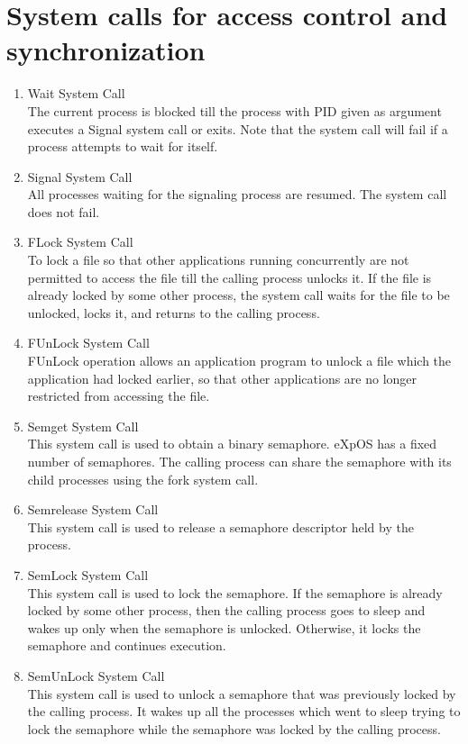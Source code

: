 \section{System calls for access control and synchronization}
\begin{enumerate}
\item{Wait System Call}
\\
The current process is blocked till the process with PID given as argument executes a Signal system call or exits. Note that the system call will fail if a process attempts to wait for itself.  

\item{Signal System Call}
\\
All processes waiting for the signaling process are resumed. The system call does not fail.


\item{FLock System Call}
\\
To lock a file so that other applications running concurrently are not permitted to access the file till the calling process unlocks it. If the file is already locked by some other process, the system call waits for the file to be unlocked, locks it, and returns to the calling process.   


\item{FUnLock System Call}
\\
FUnLock operation allows an application program to unlock a file which the application had locked earlier, so that other applications are no longer restricted from accessing the file.   
 

\item{Semget System Call}
\\
This system call is used to obtain a binary semaphore. eXpOS has a fixed number of semaphores. The calling process can share the semaphore with its child processes using the fork system call. 


\item{Semrelease System Call}
\\
This system call is used to release a semaphore descriptor held by the process.  


\item{SemLock System Call}
\\
This system call is used to lock the semaphore. If the semaphore is already locked by some other process, then the calling process goes to sleep and wakes up only when the semaphore is unlocked. Otherwise, it locks the semaphore and continues execution. 

\item{SemUnLock System Call}
\\
This system call is used to unlock a semaphore that was previously locked by the calling process. It wakes up all the processes which went to sleep trying to lock the semaphore while the semaphore was locked by the calling process. 
\end{enumerate}
